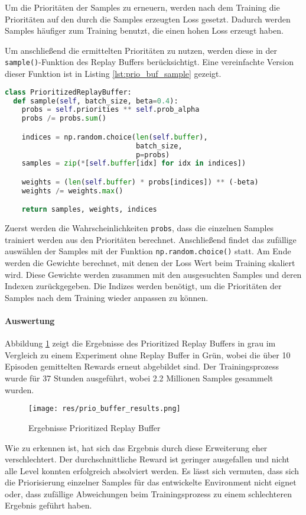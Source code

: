 \documentclass[11pt]{scrartcl}
\begin{document}
Um die Prioritäten der Samples zu erneuern, werden nach dem Training die Prioritäten auf
den durch die Samples erzeugten Loss gesetzt. Dadurch werden Samples häufiger zum
Training benutzt, die einen hohen Loss erzeugt haben.

Um anschließend die ermittelten Prioritäten zu nutzen, werden diese in der
\lstinline!sample()!-Funktion des Replay Buffers berücksichtigt. Eine vereinfachte Version
dieser Funktion ist in Listing \ref{lst:prio_buf_sample} gezeigt.
\begin{lstlisting}[language=Python, caption=sample()-Funktion des PrioritizedReplayBuffers,
label=lst:prio_buf_sample]
class PrioritizedReplayBuffer:
  def sample(self, batch_size, beta=0.4):
    probs = self.priorities ** self.prob_alpha
    probs /= probs.sum()

    indices = np.random.choice(len(self.buffer),
                               batch_size,
                               p=probs)
    samples = zip(*[self.buffer[idx] for idx in indices])

    weights = (len(self.buffer) * probs[indices]) ** (-beta)
    weights /= weights.max()

    return samples, weights, indices
\end{lstlisting}
\noindent
Zuerst werden die Wahrscheinlichkeiten \lstinline!probs!, dass die einzelnen Samples
trainiert werden aus den Prioritäten berechnet. Anschließend findet das zufällige
auswählen der Samples mit der Funktion \lstinline!np.random.choice()! statt. Am Ende
werden die Gewichte berechnet, mit denen der Loss Wert beim Training skaliert wird. Diese
Gewichte werden zusammen mit den ausgesuchten Samples und deren Indexen zurückgegeben.
Die Indizes werden benötigt, um die Prioritäten der Samples nach dem Training wieder
anpassen zu können.

\paragraph*{Auswertung}
Abbildung \ref{fig:prio_buf_results} zeigt die Ergebnisse des Prioritized Replay Buffers
in grau im Vergleich zu einem Experiment ohne Replay Buffer in Grün, wobei die über 10
Episoden gemittelten Rewards erneut abgebildet sind. Der Trainingsprozess wurde für 37
Stunden ausgeführt, wobei 2.2 Millionen Samples gesammelt wurden.
\begin{figure}[htp]
\centering
\texttt{[image: res/prio\_buffer\_results.png]}
\caption{Ergebnisse Prioritized Replay Buffer}
\label{fig:prio_buf_results}
\end{figure}
\noindent
Wie zu erkennen ist, hat sich das Ergebnis durch diese Erweiterung eher verschlechtert.
Der durchschnittliche Reward ist geringer ausgefallen und nicht alle Level konnten
erfolgreich absolviert werden. Es lässt sich vermuten, dass sich die Priorisierung
einzelner Samples für das entwickelte Environment nicht eignet oder, dass zufällige
Abweichungen beim Trainingsprozess zu einem schlechteren Ergebnis geführt haben.
\end{document}
